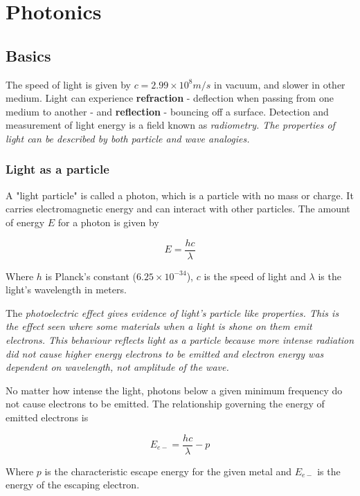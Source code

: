 \chapter{Photonics}
\label{ch:marketbasics}

\section{Basics}

The speed of light is given by $c=2.99\times10^8m/s$ in vacuum, and slower in other medium. Light can experience \textbf{refraction} - deflection when passing from one medium to another - and \textbf{reflection} - bouncing off a surface. Detection and measurement of light energy is a field known as \em{radiometry}. The properties of light can be described by both particle and wave analogies. 

\subsection{Light as a particle}

A "light particle" is called a photon, which is a particle with no mass or charge. It carries electromagnetic energy and can interact with other particles. The amount of energy $E$ for a photon is given by 

\begin{equation}
E=\frac{hc}{\lambda}
\end{equation}

Where $h$ is Planck's constant ($6.25\times10^{-34}$), $c$ is the speed of light and $\lambda$ is the light's wavelength in meters.

The \em{photoelectric} effect gives evidence of light's particle like properties. This is the effect seen where some materials when a light is shone on them emit electrons. This behaviour reflects light as a particle because more intense radiation did not cause higher energy electrons to be emitted and electron energy was dependent on wavelength, not amplitude of the wave.

No matter how intense the light, photons below a given minimum frequency do not cause electrons to be emitted. The relationship governing the energy of emitted electrons is

\begin{equation}
E_{e-} = \frac{hc}{\lambda} - p
\end{equation}

Where $p$ is the characteristic escape energy for the given metal and $E_{e-}$ is the energy of the escaping electron.


